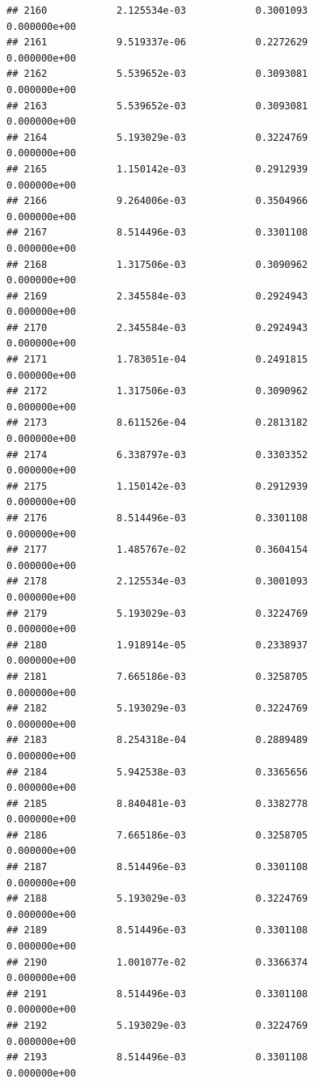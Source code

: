 \documentclass[
]{article}
\begin{document}
\begin{verbatim}
## 2160            2.125534e-03            0.3001093            0.000000e+00
## 2161            9.519337e-06            0.2272629            0.000000e+00
## 2162            5.539652e-03            0.3093081            0.000000e+00
## 2163            5.539652e-03            0.3093081            0.000000e+00
## 2164            5.193029e-03            0.3224769            0.000000e+00
## 2165            1.150142e-03            0.2912939            0.000000e+00
## 2166            9.264006e-03            0.3504966            0.000000e+00
## 2167            8.514496e-03            0.3301108            0.000000e+00
## 2168            1.317506e-03            0.3090962            0.000000e+00
## 2169            2.345584e-03            0.2924943            0.000000e+00
## 2170            2.345584e-03            0.2924943            0.000000e+00
## 2171            1.783051e-04            0.2491815            0.000000e+00
## 2172            1.317506e-03            0.3090962            0.000000e+00
## 2173            8.611526e-04            0.2813182            0.000000e+00
## 2174            6.338797e-03            0.3303352            0.000000e+00
## 2175            1.150142e-03            0.2912939            0.000000e+00
## 2176            8.514496e-03            0.3301108            0.000000e+00
## 2177            1.485767e-02            0.3604154            0.000000e+00
## 2178            2.125534e-03            0.3001093            0.000000e+00
## 2179            5.193029e-03            0.3224769            0.000000e+00
## 2180            1.918914e-05            0.2338937            0.000000e+00
## 2181            7.665186e-03            0.3258705            0.000000e+00
## 2182            5.193029e-03            0.3224769            0.000000e+00
## 2183            8.254318e-04            0.2889489            0.000000e+00
## 2184            5.942538e-03            0.3365656            0.000000e+00
## 2185            8.840481e-03            0.3382778            0.000000e+00
## 2186            7.665186e-03            0.3258705            0.000000e+00
## 2187            8.514496e-03            0.3301108            0.000000e+00
## 2188            5.193029e-03            0.3224769            0.000000e+00
## 2189            8.514496e-03            0.3301108            0.000000e+00
## 2190            1.001077e-02            0.3366374            0.000000e+00
## 2191            8.514496e-03            0.3301108            0.000000e+00
## 2192            5.193029e-03            0.3224769            0.000000e+00
## 2193            8.514496e-03            0.3301108            0.000000e+00

\end{verbatim}
\end{document}
